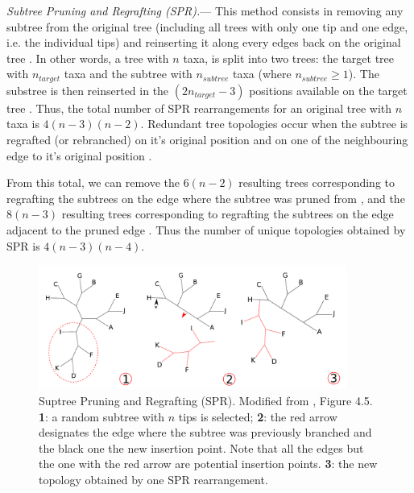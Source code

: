 \documentclass[12pt,letterpaper]{article}
\renewcommand{\subsubsection}[1]{%
\vspace{2ex}
\noindent
\textit{#1.}---}
\begin{document}
\subsubsection{Subtree Pruning and Regrafting (SPR)}
This method consists in removing any subtree from the original tree (including all trees with only one tip and one edge, i.e. the individual tips) and reinserting it along every edges back on the original tree \citep[see Fig \ref{Figure_SPR} and ][]{felsenstein2004inferring}.
In other words, a tree with $n$ taxa, is split into two trees: the target tree with $n_{target}$ taxa and the subtree with $n_{subtree}$ taxa (where $n_{subtree} \geq 1$).
The substree is then reinserted in the $(2n_{target}-3)$ positions available on the target tree \citep{felsenstein2004inferring}.
Thus, the total number of SPR rearrangements for an original tree with $n$ taxa is $4(n-3)(n-2)$.
Redundant tree topologies occur when the subtree is regrafted (or rebranched) on it's original position and on one of the neighbouring edge to it's original position \citep{allen2001subtree}.


From this total, we can remove the $6(n-2)$ resulting trees corresponding to regrafting the subtrees on the edge where the subtree was pruned from \citep[i.e. the rearrangements resulting in the same topology; ][]{allen2001subtree}, and the $8(n-3)$ resulting trees corresponding to regrafting the subtrees on the edge adjacent to the pruned edge \citep{allen2001subtree}.
Thus the number of unique topologies obtained by SPR is $4(n-3)(n-4)$.

\begin{figure}[!htbp]
\centering
   \includegraphics[width=0.9\textwidth]{Figure/SPR.pdf}
\caption{Suptree Pruning and Regrafting (SPR). Modified from \cite{felsenstein2004inferring}, Figure 4.5. \textbf{1}: a random subtree with $n$ tips is selected; \textbf{2}: the red arrow designates the edge where the subtree was previously branched and the black one the new insertion point. Note that all the edges but the one with the red arrow are potential insertion points. \textbf{3}: the new topology obtained by one SPR rearrangement.}
\label{Figure_SPR}
\end{figure}
\end{document}
